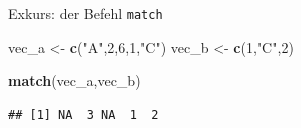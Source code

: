 \documentclass[ignorenonframetext,]{beamer}
\newenvironment{Shaded}{\begin{snugshade}}{\end{snugshade}}
\newcommand{\KeywordTok}[1]{\textcolor[rgb]{0.13,0.29,0.53}{\textbf{#1}}}
\newcommand{\DecValTok}[1]{\textcolor[rgb]{0.00,0.00,0.81}{#1}}
\newcommand{\StringTok}[1]{\textcolor[rgb]{0.31,0.60,0.02}{#1}}
\newcommand{\NormalTok}[1]{#1}
\begin{document}
\begin{frame}[fragile]{Exkurs: der Befehl \texttt{match}}

\begin{Shaded}
\begin{Highlighting}[]
\NormalTok{vec_a <-}\StringTok{ }\KeywordTok{c}\NormalTok{(}\StringTok{"A"}\NormalTok{,}\DecValTok{2}\NormalTok{,}\DecValTok{6}\NormalTok{,}\DecValTok{1}\NormalTok{,}\StringTok{"C"}\NormalTok{)}
\NormalTok{vec_b <-}\StringTok{ }\KeywordTok{c}\NormalTok{(}\DecValTok{1}\NormalTok{,}\StringTok{"C"}\NormalTok{,}\DecValTok{2}\NormalTok{)}

\KeywordTok{match}\NormalTok{(vec_a,vec_b)}
\end{Highlighting}
\end{Shaded}

\begin{verbatim}
## [1] NA  3 NA  1  2
\end{verbatim}

\end{frame}
\end{document}
